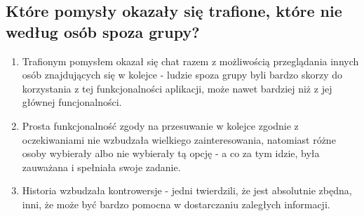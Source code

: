\documentclass[12pt]{article}
\begin{document}
\subsection{Które pomysły okazały się trafione, które nie według osób spoza grupy?}
\begin{enumerate}
	\item Trafionym pomysłem okazał się chat razem z możliwością przeglądania innych osób znajdujących się w kolejce - ludzie spoza grupy byli bardzo skorzy do korzystania z tej funkcjonalności aplikacji, może nawet bardziej niż z jej głównej funcjonalności.
	\item Prosta funkcjonalność zgody na przesuwanie w kolejce zgodnie z oczekiwaniami nie wzbudzała wielkiego zainteresowania, natomiast różne osoby wybierały albo nie wybierały tą opcję - a co za tym idzie, była zauważana i spełniała swoje zadanie.
	\item Historia wzbudzała kontrowersje - jedni twierdzili, że jest absolutnie zbędna, inni, że może być bardzo pomocna w dostarczaniu zaległych informacji.
\end{enumerate}


\clearpage
\end{document}
